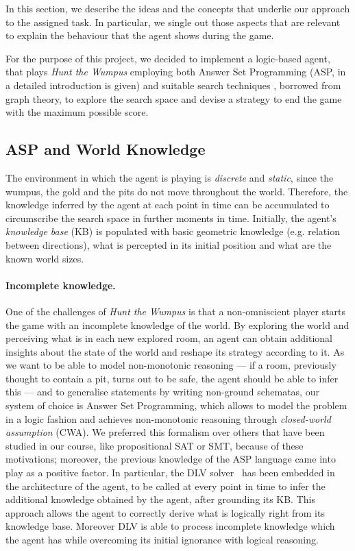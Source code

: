 \documentclass{llncs}
\newcommand{\htw}{\emph{Hunt the Wumpus }}
\begin{document}
In this section, we describe the ideas and the concepts that underlie our approach to the assigned task.
In particular, we single out those aspects that are relevant to explain the behaviour that the agent shows during the game.

For the purpose of this project, we decided to implement a logic-based agent, that plays \htw employing both Answer Set Programming (ASP, in~\cite{ASPprimer} a detailed introduction is given) and suitable search techniques , borrowed from graph theory, to explore the search space and devise a strategy to end the game with the maximum possible score.

\subsection{ASP and World Knowledge}

The environment in which the agent is playing is \emph{discrete} and \emph{static}, since the wumpus, the gold and the pits do not move throughout the world.
Therefore, the knowledge inferred by the agent at each point in time can be accumulated to circumscribe the search space in further moments in time.
Initially, the agent's \emph{knowledge base} (KB) is populated with basic geometric knowledge (e.g. relation between directions), what is percepted in its initial position and what are the known world sizes.

\paragraph{Incomplete knowledge.} One of the challenges of \htw is that a non-omniscient player starts the game with an incomplete knowledge of the world.
By exploring the world and perceiving what is in each new explored room, an agent can obtain additional insights about the state of the world and reshape its strategy according to it.
As we want to be able to model non-monotonic reasoning --- if a room, previously thought to contain a pit, turns out to be safe, the agent should be able to infer this --- and to generalise statements by writing non-ground schematas, our system of choice is Answer Set Programming, which allows to model the problem in a logic fashion and achieves non-monotonic reasoning through \emph{closed-world assumption} (CWA).
We preferred this formalism over others that have been studied in our course, like propositional SAT or SMT, because of these motivations; moreover, the previous knowledge of the ASP language came into play as a positive factor.
In particular, the DLV solver~\cite{DLV-system} has been embedded in the architecture of the agent, to be called at every point in time to infer the additional knowledge obtained by the agent, after grounding its KB.
This approach allows the agent to correctly derive what is logically right from its knowledge base. Moreover DLV is able to process incomplete knowledge which the agent has while overcoming its initial ignorance with logical reasoning.
\end{document}
